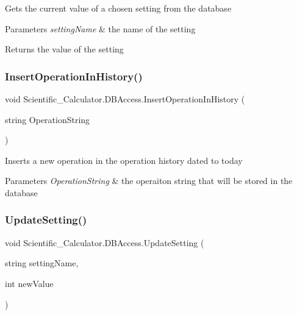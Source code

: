 Gets the current value of a chosen setting from the database 


\begin{DoxyParams}{Parameters}
{\em setting\+Name} & the name of the setting\\
\hline
\end{DoxyParams}
\begin{DoxyReturn}{Returns}
the value of the setting
\end{DoxyReturn}
\mbox{\label{class_scientific___calculator_1_1_d_b_access_a9bfbf5393338345c6d5b41cb43fbc56b}} 
\subsubsection{\texorpdfstring{Insert\+Operation\+In\+History()}{InsertOperationInHistory()}}
{\footnotesize\ttfamily void Scientific\+\_\+\+Calculator.\+D\+B\+Access.\+Insert\+Operation\+In\+History (\begin{DoxyParamCaption}\item[{string}]{Operation\+String }\end{DoxyParamCaption})}



Inserts a new operation in the operation history dated to today 


\begin{DoxyParams}{Parameters}
{\em Operation\+String} & the operaiton string that will be stored in the database\\
\hline
\end{DoxyParams}
\mbox{\label{class_scientific___calculator_1_1_d_b_access_a3ada18c0a3a5a48dd7b88b166b715c7d}} 
\subsubsection{\texorpdfstring{Update\+Setting()}{UpdateSetting()}}
{\footnotesize\ttfamily void Scientific\+\_\+\+Calculator.\+D\+B\+Access.\+Update\+Setting (\begin{DoxyParamCaption}\item[{string}]{setting\+Name,  }\item[{int}]{new\+Value }\end{DoxyParamCaption})}



